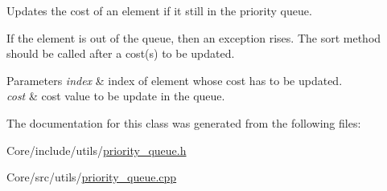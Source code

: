 Updates the cost of an element if it still in the priority queue. 

If the element is out of the queue, then an exception rises. The sort method should be called after a cost(s) to be updated. 
\begin{DoxyParams}{Parameters}
{\em index} & index of element whose cost has to be updated. \\
\hline
{\em cost} & cost value to be update in the queue. \\
\hline
\end{DoxyParams}


The documentation for this class was generated from the following files\+:\begin{DoxyCompactItemize}
\item 
Core/include/utils/\hyperlink{priority__queue_8h}{priority\+\_\+queue.\+h}\item 
Core/src/utils/\hyperlink{priority__queue_8cpp}{priority\+\_\+queue.\+cpp}\end{DoxyCompactItemize}
